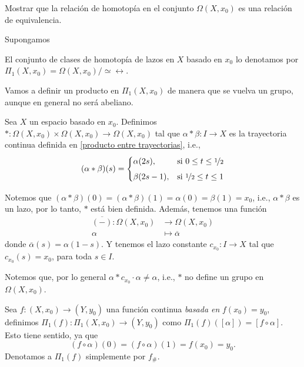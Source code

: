 \begin{ejercicio}
    Mostrar que la relación de homotopía en el conjunto $\Omega(X,x_0)$ es una relación de equivalencia.
    \begin{dem}
        Supongamos
    \end{dem}
\end{ejercicio}
\begin{definicion}
    El conjunto de clases de homotopía de lazos en $X$ basado en $x_0$ lo denotamos por $\Pi_1(X,x_0)=\Omega(X,x_0)/\simeq\rel$.
\end{definicion}
Vamos a definir un producto en $\Pi_1(X,x_0)$ de manera que se vuelva un grupo, aunque en general no será abeliano.
\begin{definicion}
    Sea $X$ un espacio basado en $x_0$.
    Definimos $*:\Omega(X,x_0)\times \Omega(X,x_0)\to \Omega(X,x_0)$ tal que $\alpha*\beta:I\to X$ es la trayectoria continua definida en \ref{producto entre trayectorias}, i.e.,
    \[
(\alpha * \beta)(s) = 
\begin{cases} 
\alpha(2s), & \text{si } 0 \leq t \leq \nicefrac{1}{2} \\[1ex]
\beta(2s - 1), & \text{si } \nicefrac{1}{2} \leq t \leq 1 
\end{cases}
\]
\end{definicion}
Notemos que $(\alpha*\beta)(0)=(\alpha*\beta)(1)=\alpha(0)=\beta(1)=x_0$, i.e., $\alpha*\beta$ es un lazo, por lo tanto, $*$ está bien definida. Además, tenemos una función 
\begin{equation}
    \begin{split}
        \overline{(-)}:\Omega(X,x_0)&\to\Omega(X,x_0)\\
    \alpha&\mapsto \overline{\alpha}
    \end{split}
\end{equation}
donde $\overline{\alpha}(s)=\alpha(1-s)$. Y tenemos el lazo constante $c_{x_0}:I\to X$ tal que $c_{x_0}(s)=x_0$, para toda $s\in I$.
    \begin{nota}
        Notemos que, por lo general $\alpha* c_{x_0}\cdot \alpha \neq \alpha$, i.e., $*$ no define un grupo en $\Omega(X,x_0)$.
    \end{nota}
    \begin{definicion}
        Sea $f:(X,x_0)\to(Y,y_0)$ una función continua \textit{basada en} $f(x_0)=y_0$, definimos $\Pi_1(f):\Pi_1(X,x_0)\to(Y,y_0)$ como $\Pi_1(f)([ \alpha])=[f\circ \alpha]$. Esto tiene sentido, ya que 
        $$(f\circ\alpha)(0)=(f\circ\alpha)(1)=f(x_0)=y_0.$$ 
        Denotamos a $\Pi_1(f)$ simplemente por $f_\#$.
    \end{definicion}
